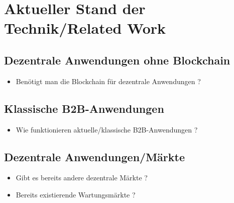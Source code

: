 \chapter{Aktueller Stand der Technik/Related Work}
\label{cha:stand-technik}

\section{Dezentrale Anwendungen ohne Blockchain}
\begin{itemize}
    \item Benötigt man die Blockchain für dezentrale Anwendungen ?
\end{itemize}

\section{Klassische B2B-Anwendungen}
\begin{itemize}
    \item Wie funktionieren aktuelle/klassische B2B-Anwendungen ?
\end{itemize}

\section{Dezentrale Anwendungen/Märkte}
\begin{itemize}
    \item Gibt es bereits andere dezentrale Märkte ? 
    \item Bereits existierende Wartungsmärkte ?
\end{itemize}


